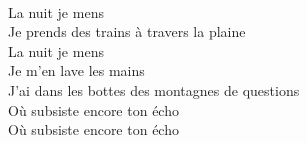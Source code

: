 \\
La nuit je mens \\
Je prends des trains à travers la plaine \\
La nuit je mens \\
Je m'en lave les mains \\
J'ai dans les bottes des montagnes de questions \\
Où subsiste encore ton écho \\
Où subsiste encore ton écho \\
